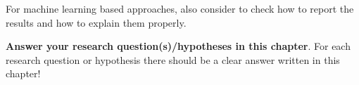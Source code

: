 For machine learning based approaches, also consider to check how to report the results and how to explain them properly. 

\textbf{Answer your research question(s)/hypotheses in this chapter}. For each research question or hypothesis there should be a clear answer written in this chapter!

